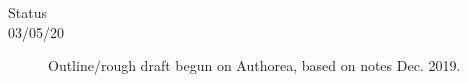 \begin{description}
\item [{Status}] 
\item [{03/05/20}] Outline/rough draft begun on Authorea, based on notes Dec. 2019.
\end{description}